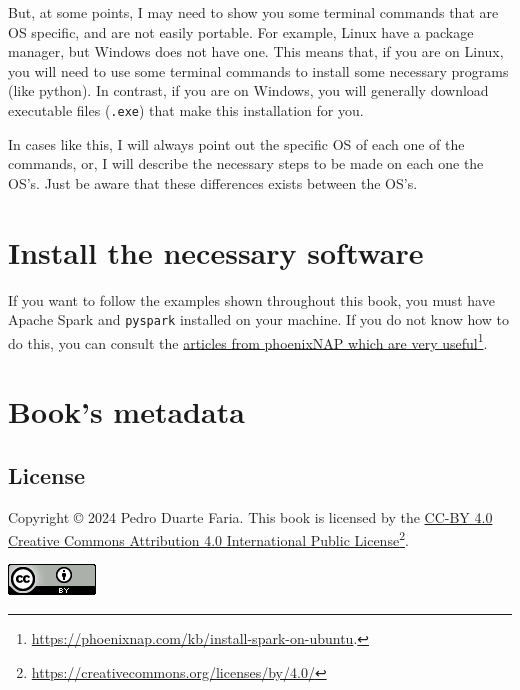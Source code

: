 \documentclass[
  11pt,
  letterpaper,
  DIV=11,
  numbers=noendperiod]{scrreprt}
\begin{document}
But, at some points, I may need to show you some terminal commands that
are OS specific, and are not easily portable. For example, Linux have a
package manager, but Windows does not have one. This means that, if you
are on Linux, you will need to use some terminal commands to install
some necessary programs (like python). In contrast, if you are on
Windows, you will generally download executable files (\texttt{.exe})
that make this installation for you.

In cases like this, I will always point out the specific OS of each one
of the commands, or, I will describe the necessary steps to be made on
each one the OS's. Just be aware that these differences exists between
the OS's.

\section*{Install the necessary
software}\label{install-the-necessary-software}


If you want to follow the examples shown throughout this book, you must
have Apache Spark and \texttt{pyspark} installed on your machine. If you
do not know how to do this, you can consult the
\href{https://phoenixnap.com/kb/install-spark-on-ubuntu}{articles from
phoenixNAP which are very useful}\footnote{\url{https://phoenixnap.com/kb/install-spark-on-ubuntu}.}.

\section*{Book's metadata}\label{books-metadata}


\subsection*{License}\label{license}

Copyright © 2024 Pedro Duarte Faria. This book is licensed by the
\href{https://creativecommons.org/licenses/by/4.0/}{CC-BY 4.0 Creative
Commons Attribution 4.0 International Public License}\footnote{\url{https://creativecommons.org/licenses/by/4.0/}}.

\includegraphics[width=0.91667in,height=\textheight]{Figures/creative-commoms-88x31.png}
\end{document}

